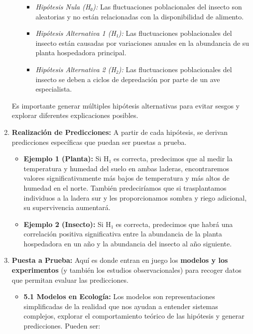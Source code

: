 \documentclass[
]{book}
\providecommand{\tightlist}{%
  \setlength{\itemsep}{0pt}\setlength{\parskip}{0pt}}
\begin{document}
\begin{enumerate}
\begin{itemize}
    \begin{itemize}
    \tightlist
    \item
      \emph{Hipótesis Nula (H₀):} Las fluctuaciones poblacionales del insecto son aleatorias y no están relacionadas con la disponibilidad de alimento.
    \item
      \emph{Hipótesis Alternativa 1 (H₁):} Las fluctuaciones poblacionales del insecto están causadas por variaciones anuales en la abundancia de su planta hospedadora principal.
    \item
      \emph{Hipótesis Alternativa 2 (H₂):} Las fluctuaciones poblacionales del insecto se deben a ciclos de depredación por parte de un ave especialista.
    \end{itemize}
  \end{itemize}

  Es importante generar múltiples hipótesis alternativas para evitar sesgos y explorar diferentes explicaciones posibles.
\item
  \textbf{Realización de Predicciones:} A partir de cada hipótesis, se derivan predicciones específicas que puedan ser puestas a prueba.

  \begin{itemize}
  \tightlist
  \item
    \textbf{Ejemplo 1 (Planta):} Si H₁ es correcta, predecimos que al medir la temperatura y humedad del suelo en ambas laderas, encontraremos valores significativamente más bajos de temperatura y más altos de humedad en el norte. También predeciríamos que si trasplantamos individuos a la ladera sur y les proporcionamos sombra y riego adicional, su supervivencia aumentará.
  \item
    \textbf{Ejemplo 2 (Insecto):} Si H₁ es correcta, predecimos que habrá una correlación positiva significativa entre la abundancia de la planta hospedadora en un año y la abundancia del insecto al año siguiente.
  \end{itemize}
\item
  \textbf{Puesta a Prueba:} Aquí es donde entran en juego los \textbf{modelos y los experimentos} (y también los estudios observacionales) para recoger datos que permitan evaluar las predicciones.

  \begin{itemize}
  \tightlist
  \item
    \textbf{5.1 Modelos en Ecología:} Los modelos son representaciones simplificadas de la realidad que nos ayudan a entender sistemas complejos, explorar el comportamiento teórico de las hipótesis y generar predicciones. Pueden ser:


\end{itemize}
\end{enumerate}
\end{document}
